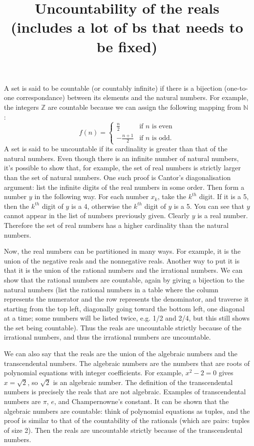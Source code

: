 \documentclass[letterpaper]{article}
\title{Uncountability of the reals (includes a lot of bs that needs to be fixed)}
\numberwithin{equation}{section}
\begin{document}
\maketitle

A set is said to be countable (or countably infinite) if there is a bijection (one-to-one correspondance) between its elements and the natural numbers. For example, the integers $\mathbb{Z}$ are countable because we can assign the following mapping from $\mathbb{N}$:
\[
  f(n)=
  \begin{cases}
    \frac{n}{2} & \text{if $n$ is even}\\
    -\frac{n+1}{2} & \text{if $n$ is odd.}
  \end{cases}
\]
A set is said to be uncountable if its cardinality is greater than that of the natural numbers. Even though there is an infinite number of natural numbers, it's possible to show that, for example, the set of real numbers is strictly larger than the set of natural numbers. One such proof is Cantor's diagonalisation argument: list the infinite digits of the real numbers in some order. Then form a number $y$ in the following way. For each number $x_k$, take the $k^{th}$ digit. If it is a 5, then the $k^{th}$ digit of $y$ is a 4, otherwise the $k^{th}$ digit of $y$ is a 5. You can see that $y$ cannot appear in the list of numbers previously given. Clearly $y$ is a real number. Therefore the set of real numbers has a higher cardinality than the natural numbers.

Now, the real numbers can be partitioned in many ways. For example, it is the union of the negative reals and the nonnegative reals. Another way to put it is that it is the union of the rational numbers and the irrational numbers. We can show that the rational numbers are countable, again by giving a bijection to the natural numbers (list the rational numbers in a table where the column represents the numerator and the row represents the denominator, and traverse it starting from the top left, diagonally going toward the bottom left, one diagonal at a time; some numbers will be listed twice, e.g. 1/2 and 2/4, but this still shows the set being countable). Thus the reals are uncountable strictly because of the irrational numbers, and thus the irrational numbers are uncountable.

We can also say that the reals are the union of the algebraic numbers and the transcendental numbers. The algebraic numbers are the numbers that are roots of polynomial equations with integer coefficients. For example, $x^2-2=0$ gives $x=\sqrt{2}$, so $\sqrt{2}$ is an algebraic number. The definition of the transcendental numbers is precisely the reals that are not algebraic. Examples of transcendental numbers are $\pi$, $e$, and Champernowne's constant. It can be shown that the algebraic numbers are countable: think of polynomial equations as tuples, and the proof is similar to that of the countability of the rationals (which are pairs: tuples of size 2). Then the reals are uncountable strictly because of the transcendental numbers.
\end{document}
